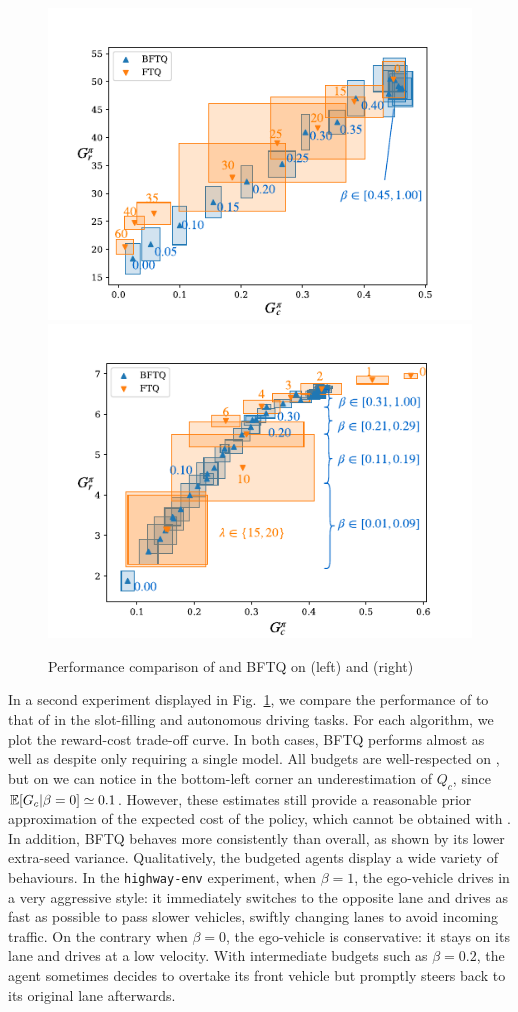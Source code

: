 \documentclass{article}
\begin{document}
\begin{figure}[tp]
    \begin{center}
    \includegraphics[width=0.49\linewidth]{source/img/slot-filling}
    \includegraphics[width=0.49\linewidth]{source/img/highway}
    \caption{Performance comparison of \FTQl and BFTQ on  (left) and (right) }
    \label{fig:results}
    \end{center}
\end{figure}

In a second experiment displayed in Fig.~\ref{fig:results}, we compare the performance of \FTQl to that of \BFTQ in the slot-filling and autonomous driving tasks. For each algorithm, we plot the reward-cost trade-off curve. In both cases, BFTQ performs almost as well as \FTQl despite only requiring a single model. All budgets are well-respected on , but on  we can notice in the bottom-left corner an underestimation of $Q_c$, since $\operatorname*{\mathbb{E}}[G_c|\beta=0] \simeq 0.1 $. However, these estimates still provide a reasonable prior approximation of the expected cost of the policy, which cannot be obtained with \FTQl. In addition, BFTQ behaves more consistently than \FTQl overall, as shown by its lower extra-seed variance. Qualitatively, the budgeted agents display a wide variety of behaviours. In the \texttt{highway-env} experiment, when $\beta = 1$, the ego-vehicle drives in a very aggressive style: it immediately switches to the opposite lane and drives as fast as possible to pass slower vehicles, swiftly changing lanes to avoid incoming traffic. On the contrary when $\beta = 0$, the ego-vehicle is conservative: it stays on its lane and drives at a low velocity. With intermediate budgets such as $\beta = 0.2$, the agent sometimes decides to overtake its front vehicle but promptly steers back to its original lane afterwards.
\end{document}
